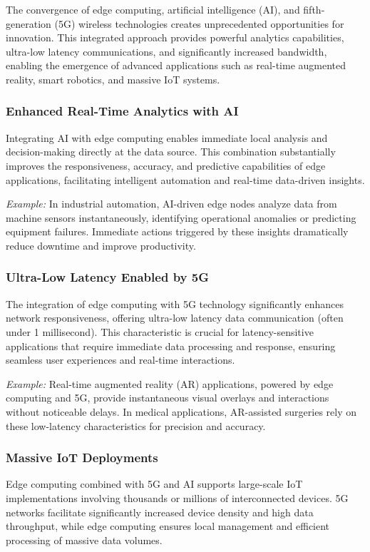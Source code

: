\documentclass[runningheads]{llncs}
\begin{document}
The convergence of edge computing, artificial intelligence (AI), and fifth-generation (5G) wireless technologies creates unprecedented opportunities for innovation. This integrated approach provides powerful analytics capabilities, ultra-low latency communications, and significantly increased bandwidth, enabling the emergence of advanced applications such as real-time augmented reality, smart robotics, and massive IoT systems.

\subsubsection{Enhanced Real-Time Analytics with AI}
Integrating AI with edge computing enables immediate local analysis and decision-making directly at the data source. This combination substantially improves the responsiveness, accuracy, and predictive capabilities of edge applications, facilitating intelligent automation and real-time data-driven insights.

\noindent\textit{Example:} In industrial automation, AI-driven edge nodes analyze data from machine sensors instantaneously, identifying operational anomalies or predicting equipment failures. Immediate actions triggered by these insights dramatically reduce downtime and improve productivity.

\subsubsection{Ultra-Low Latency Enabled by 5G}
The integration of edge computing with 5G technology significantly enhances network responsiveness, offering ultra-low latency data communication (often under 1 millisecond). This characteristic is crucial for latency-sensitive applications that require immediate data processing and response, ensuring seamless user experiences and real-time interactions.

\noindent\textit{Example:} Real-time augmented reality (AR) applications, powered by edge computing and 5G, provide instantaneous visual overlays and interactions without noticeable delays. In medical applications, AR-assisted surgeries rely on these low-latency characteristics for precision and accuracy.

\subsubsection{Massive IoT Deployments}
Edge computing combined with 5G and AI supports large-scale IoT implementations involving thousands or millions of interconnected devices. 5G networks facilitate significantly increased device density and high data throughput, while edge computing ensures local management and efficient processing of massive data volumes.
\end{document}
